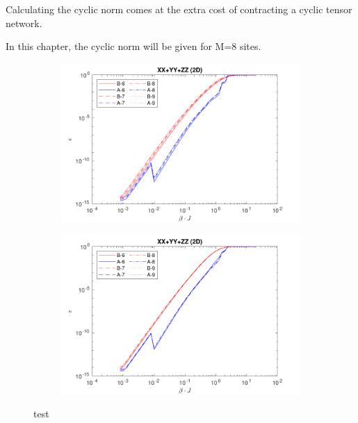 Calculating the cyclic norm comes at the extra cost of contracting a cyclic tensor network. 

In this chapter, the cyclic norm will be given for M=8 sites.

\begin{figure}[H]
    \begin{subfigure}[]{\textwidth}
        \includegraphics[width=\textwidth]{Figuren/benchmarking/keuze_norm/linear.pdf}
    \end{subfigure}

    \begin{subfigure}[]{\textwidth}
        \includegraphics[width=\textwidth]{Figuren/benchmarking/keuze_norm/cyclic.pdf}
    \end{subfigure}
    \caption{test }
    \label{benchmarking:systemsize}
\end{figure}

